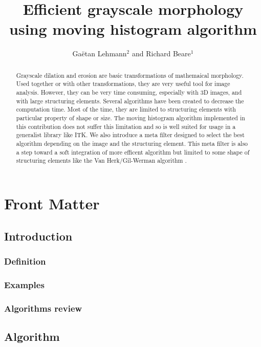 \documentclass{InsightArticle}
\title{Efficient grayscale morphology using moving histogram algorithm}
\author{Ga\"etan Lehmann{$^2$} {\small{and}} Richard Beare{$^1$}}
\begin{document}
\maketitle

\ifhtml
\chapter*{Front Matter\label{front}}
\fi


\begin{abstract}
\noindent
Grayscale dilation and erosion are basic transformations of mathemaical
morphology. Used together or with other transformations, they are very useful
tool for image analysis. However, they can be very time consuming, especially
with 3D images, and with large structuring elements. Several algorithms have
been created to decrease the computation time. Most of the time, they are
limited to structuring elements with particular property of shape or size. The
moving histogram algorithm \cite{vandroogenbroeckTalbot96} implemented in this
contribution does not suffer this limitation and so is well suited for usage in
a generalist library like ITK. We also introduce a meta filter designed to
select the best algorithm depending on the image and the structuring element.
This meta filter is also a step toward a soft integration of more efficent
algorithm but limited to some shape of structuring elements like the Van
Herk/Gil-Werman algorithm \cite{vanHerk92,GilWerman93}.
\end{abstract}



\section{Introduction}

  \subsection{Definition}

  \subsection{Examples}

  \subsection{Algorithms review}

\section{Algorithm}
\end{document}
